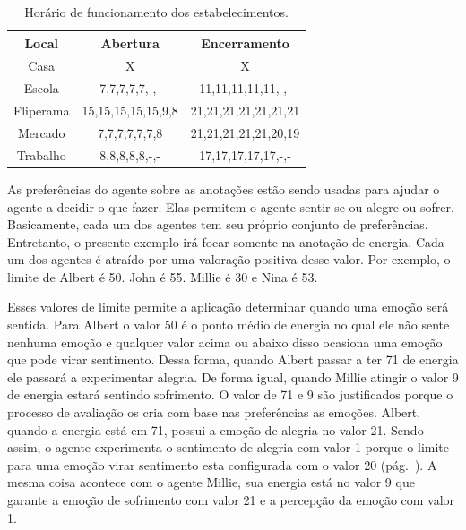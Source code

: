 \begin{table}[h]
	\caption{Horário de funcionamento dos estabelecimentos.}
	\label{tab:estaloca}
	\begin{center}
	\begin{tabular}{|c|c|c|}
		\hline
		Local & Abertura & Encerramento \\ \hline
		Casa & X & X \\ \hline
		Escola & 7,7,7,7,7,-,- & 11,11,11,11,11,-,- \\ \hline
		Fliperama & 15,15,15,15,15,9,8 & 21,21,21,21,21,21,21 \\ \hline
		Mercado & 7,7,7,7,7,7,8 & 21,21,21,21,21,20,19 \\ \hline
		Trabalho & 8,8,8,8,8,-,- & 17,17,17,17,17,-,- \\ \hline
	\end{tabular}
	\end{center}
\end{table}

As preferências do agente sobre as anotações estão sendo usadas para ajudar o
agente a decidir o que fazer. Elas permitem o agente sentir-se ou alegre ou
sofrer. Basicamente, cada um dos agentes tem seu próprio conjunto de
preferências. Entretanto, o presente exemplo irá focar somente na anotação de
energia. Cada um dos agentes é atraído por uma valoração positiva desse valor.
Por exemplo, o limite de Albert é 50. John é 55. Millie é 30 e Nina é 53.

Esses valores de limite permite a aplicação determinar quando uma emoção será
sentida. Para Albert o valor 50 é o ponto médio de energia no qual ele não
sente nenhuma emoção e qualquer valor acima ou abaixo disso ocasiona uma
emoção que pode virar sentimento. Dessa forma, quando Albert passar a ter 71 de energia
ele passará a experimentar alegria. De forma igual, quando Millie atingir o
valor 9 de energia estará sentindo sofrimento. O valor de 71 e 9 são
justificados porque o processo de avaliação os cria com base nas preferências as
emoções. Albert, quando a energia está em 71, possui a emoção de alegria no
valor 21. Sendo assim, o agente experimenta o sentimento de alegria com valor
1 porque o limite para uma emoção virar sentimento esta configurada com o
valor 20 (pág.~\pageref{mark:emo}). A mesma coisa acontece com o agente Millie,
sua energia está no valor 9 que garante a emoção de sofrimento com valor 21 e
a percepção da emoção com valor 1.

